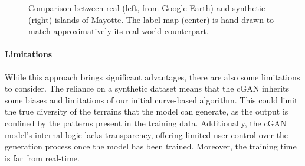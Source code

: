 \begin{figure}[t]
    \caption{Comparison between real (left, from Google Earth) and synthetic (right) islands of Mayotte. The label map (center) is hand-drawn to match approximatively its real-world counterpart. }
    \label{fig:coral-island_example-Mayotte}
\end{figure}




\paragraph{Limitations} 
While this approach brings significant advantages, there are also some limitations to consider. The reliance on a synthetic dataset means that the cGAN inherits some biases and limitations of our initial curve-based algorithm. This could limit the true diversity of the terrains that the model can generate, as the output is confined by the patterns present in the training data. Additionally, the cGAN model's internal logic lacks transparency, offering limited user control over the generation process once the model has been trained. Moreover, the training time is far from real-time. %

